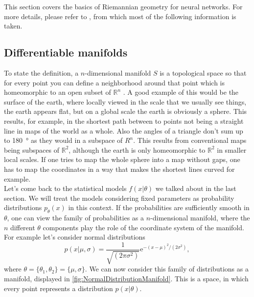 This section covers the basics of Riemannian geometry for neural networks. For more details, please refer to \cite{AmarisLectureNotes}, from which most of the following information is taken.
\subsection{Differentiable manifolds}\label{sec:Manifolds}
To state the definition, a $n$-dimensional manifold $S$ is a topological space so that for every point you can define a neighborhood around that point which is homeomorphic to an open subset of $\mathbb{R}^n$ \cite{AmarisLectureNotes}. A good example of this would be the surface of the earth, where locally viewed in the scale that we usually see things, the earth appears flat, but on a global scale the earth is obviously a sphere. This results, for example, in the shortest path between to points not being a straight line in maps of the world as a whole. Also the angles of a triangle don't sum up to \SI{180}{\degree} as they would in a subspace of $R^n$. This results from conventional maps being subspaces of $\mathbb{R}^2$, although the earth is only homeomorphic to $\mathbb{R}^2$ in smaller local scales. If one tries to map the whole sphere into a map without gaps, one has to map the coordinates in a way that makes the shortest lines curved for example.\\
Let's come back to the statistical models $f(x|\theta)$ we talked about in the last section. We will treat the models considering fixed parameters as probability distributions $p_\theta(x)$ in this context. If the probabilities are sufficiently smooth in $\theta$, one can view the family of probabilities as a $n$-dimensional manifold, where the $n$ different $\theta$ components play the role of the coordinate system of the manifold. \\
For example let's consider normal distributions \cite{AmarisLectureNotes}
\begin{equation}
	p(x|\mu,\sigma) = \frac{1}{\sqrt{(2\pi\sigma^2)}} \mathrm{e}^{-(x-\mu)^2/(2\sigma^2)},
\end{equation}
where $\theta = \{\theta_1,\theta_2\} = \{\mu,\sigma\}$. We can now consider this family of distributions as a manifold, displayed in \cref{fig:NormalDistributionManifold}. This is a space, in which every point represents a distribution $p(x|\theta)$.

